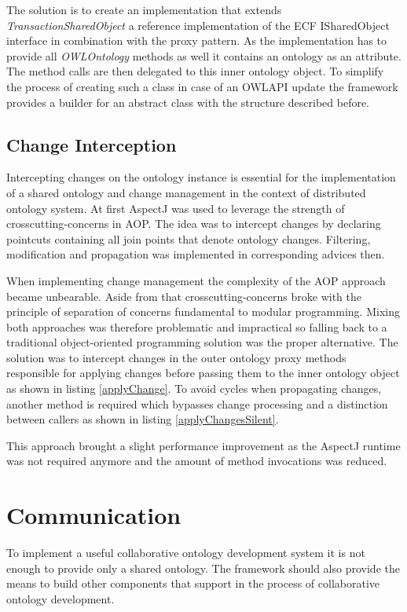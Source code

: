 The solution is to create an implementation that extends 
\emph{TransactionSharedObject} a reference implementation of the ECF
ISharedObject interface in combination with the proxy pattern.
As the implementation has to provide all \emph{OWLOntology} methods as well it
contains an ontology as an attribute. The method calls are then
delegated to this inner ontology object.
To simplify the process of creating such a class in case of an OWLAPI update
the framework provides a builder for an abstract class with the structure
described before.

\subsection{Change Interception}
Intercepting changes on the ontology instance is essential for the
implementation of a shared ontology and change management in the
context of distributed ontology system. At first AspectJ was used to
leverage the strength of crosscutting-concerns in AOP. The idea was
to intercept changes by declaring pointcuts containing all join points
that denote ontology changes. Filtering, modification and propagation
was implemented in corresponding advices then.

When implementing change management the complexity of the AOP approach
became unbearable. Aside from that crosscutting-concerns broke with
the principle of separation of concerns fundamental to modular programming.
Mixing both approaches was therefore problematic and impractical so
falling back to a traditional object-oriented programming solution was
the proper alternative. The solution was to intercept changes in the 
outer ontology proxy methods responsible for applying changes
before passing them to the inner ontology object as shown in listing
\ref{applyChange}. To avoid cycles when propagating changes, another
method is required which bypasses change processing and a distinction
between callers as shown in listing \ref{applyChangesSilent}.

This approach brought a slight performance improvement
as the AspectJ runtime was not required anymore and the amount
of method invocations was reduced.

\section{Communication}
To implement a useful collaborative ontology development system it is not
enough to provide only a shared ontology. The framework should also provide
the means to build other components that support in the process of collaborative
ontology development.

